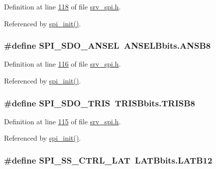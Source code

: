 Definition at line \hyperlink{a00011_source_l00118}{118} of file \hyperlink{a00011_source}{srv\+\_\+spi.\+h}.



Referenced by \hyperlink{a00030_source_l00030}{spi\+\_\+init()}.

\hypertarget{a00011_a11571727bdbc21b0bfb7c701599e759b}{
\subsubsection[{S\+P\+I\+\_\+\+S\+D\+O\+\_\+\+A\+N\+S\+E\+L}]{\setlength{\rightskip}{0pt plus 5cm}\#define S\+P\+I\+\_\+\+S\+D\+O\+\_\+\+A\+N\+S\+E\+L~A\+N\+S\+E\+L\+Bbits.\+A\+N\+S\+B8}}\label{a00011_a11571727bdbc21b0bfb7c701599e759b}


Definition at line \hyperlink{a00011_source_l00116}{116} of file \hyperlink{a00011_source}{srv\+\_\+spi.\+h}.



Referenced by \hyperlink{a00030_source_l00030}{spi\+\_\+init()}.

\hypertarget{a00011_aa171067a2f57d1555ab4449c78847c72}{
\subsubsection[{S\+P\+I\+\_\+\+S\+D\+O\+\_\+\+T\+R\+I\+S}]{\setlength{\rightskip}{0pt plus 5cm}\#define S\+P\+I\+\_\+\+S\+D\+O\+\_\+\+T\+R\+I\+S~T\+R\+I\+S\+Bbits.\+T\+R\+I\+S\+B8}}\label{a00011_aa171067a2f57d1555ab4449c78847c72}


Definition at line \hyperlink{a00011_source_l00115}{115} of file \hyperlink{a00011_source}{srv\+\_\+spi.\+h}.



Referenced by \hyperlink{a00030_source_l00030}{spi\+\_\+init()}.

\hypertarget{a00011_aa8b53e04161d178ebd9c01edf1584039}{
\subsubsection[{S\+P\+I\+\_\+\+S\+S\+\_\+\+C\+T\+R\+L\+\_\+\+L\+A\+T}]{\setlength{\rightskip}{0pt plus 5cm}\#define S\+P\+I\+\_\+\+S\+S\+\_\+\+C\+T\+R\+L\+\_\+\+L\+A\+T~L\+A\+T\+Bbits.\+L\+A\+T\+B12}}\label{a00011_aa8b53e04161d178ebd9c01edf1584039}



